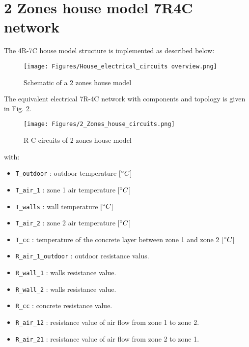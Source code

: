 \section{2 Zones house model 7R4C network}

The 4R-7C house model structure is implemented as described below:
	
\begin{figure}[H]
	\centering
	\texttt{[image: Figures/House\_electrical\_circuits overview.png]}
	\caption[Short title]{Schematic of a 2 zones house model}
	\label{fig:schema7R4C}
	\end{figure} 
	
The equivalent electrical 7R-4C network with components and topology is given in Fig. \ref{fig:elec7R4C}.

\begin{figure}[H]
	\centering
	\texttt{[image: Figures/2\_Zones\_house\_circuits.png]}
	\caption[Short title]{R-C circuits of 2 zones house model}
	\label{fig:elec7R4C}
	\end{figure}

with:
\begin{itemize}
    \item \texttt{T\_outdoor} : outdoor temperature [$^\circ C$] 
    \item \texttt{T\_air\_1}  : zone 1 air temperature [$^\circ C$]
    \item \texttt{T\_walls}   : wall temperature [$^\circ C$]
    \item \texttt{T\_air\_2}  : zone 2 air temperature [$^\circ C$]
    \item \texttt{T\_cc}      : temperature of the concrete layer between zone 1 and zone 2 [$^\circ C$]
    \item \texttt{R\_air\_1\_outdoor} : outdoor resistance valus.
    \item \texttt{R\_wall\_1} : walls resistance value.
    \item \texttt{R\_wall\_2} : walls resistance value.
    \item \texttt{R\_cc}      : concrete resistance value.
    \item \texttt{R\_air\_12} : resistance value of air flow from zone 1 to zone 2.
    \item \texttt{R\_air\_21} : resistance value of air flow from zone 2 to zone 1.
\end{itemize}

\newpage